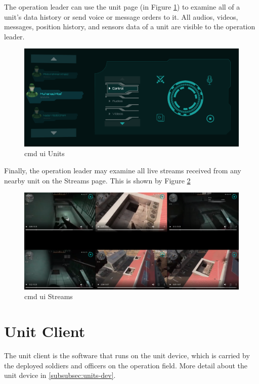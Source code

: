The operation leader can use the unit page (in Figure \ref{fig:cmd-ui-units-ch4}) to examine all of a unit's data history or send voice or message orders to it. All audios, videos, messages, position history, and sensors data of a unit are visible to the operation leader. 

\begin{figure}[!htb]
    \centering
    \includegraphics[width=15cm]{images/cmd-ui-units.png}
    \caption{\acrshort{cmd} \acrshort{ui} Units}
    \label{fig:cmd-ui-units-ch4}
\end{figure}


Finally, the operation leader may examine all live streams received from any nearby unit on the Streams page. This is shown by Figure \ref{fig:cmd-ui-streams-ch4}

\begin{figure}[!htb]
    \centering
    \includegraphics[width=15cm]{images/cmd-ui-streaming.png}
    \caption{\acrshort{cmd} \acrshort{ui} Streams}
    \label{fig:cmd-ui-streams-ch4}
\end{figure}


\section{Unit Client}
The unit client is the software that runs on the unit device, which is carried by the deployed soldiers and officers on the operation field.
More detail about the unit device in \ref{subsubsec:units-dev}.

